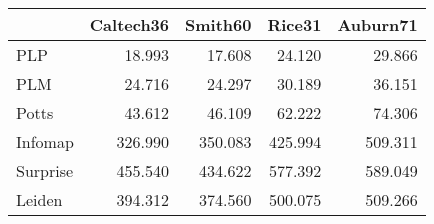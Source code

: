\begin{tabular}{lrrrr}
\toprule
{} & Caltech36 & Smith60 &  Rice31 & Auburn71 \\
\midrule
PLP      &    18.993 &  17.608 &  24.120 &   29.866 \\
PLM      &    24.716 &  24.297 &  30.189 &   36.151 \\
Potts    &    43.612 &  46.109 &  62.222 &   74.306 \\
Infomap  &   326.990 & 350.083 & 425.994 &  509.311 \\
Surprise &   455.540 & 434.622 & 577.392 &  589.049 \\
Leiden   &   394.312 & 374.560 & 500.075 &  509.266 \\
\bottomrule
\end{tabular}
